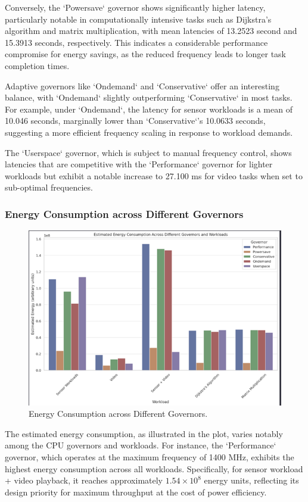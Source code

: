 \documentclass[conference]{IEEEtran}
\begin{document}
Conversely, the `Powersave` governor shows significantly higher latency, particularly notable in computationally intensive tasks such as Dijkstra's algorithm and matrix multiplication, with mean latencies of 13.2523 second and 15.3913 seconds, respectively. This indicates a considerable performance compromise for energy savings, as the reduced frequency leads to longer task completion times.

Adaptive governors like `Ondemand` and `Conservative` offer an interesting balance, with `Ondemand` slightly outperforming `Conservative` in most tasks. For example, under `Ondemand`, the latency for sensor workloads is a mean of 10.046 seconds, marginally lower than `Conservative`'s 10.0633 seconds, suggesting a more efficient frequency scaling in response to workload demands.

The `Userspace` governor, which is subject to manual frequency control, shows latencies that are competitive with the `Performance` governor for lighter workloads but exhibit a notable increase to 27.100 ms for video tasks when set to sub-optimal frequencies.

\subsubsection{Energy Consumption across Different Governors}
\begin{figure}[ht]
    \centering
    \includegraphics[width=0.75\linewidth]{energy_consumption_plot.png}
    \caption{Energy Consumption across Different Governors.}
    \label{fig:energy_consumption}
\end{figure}
\vspace{10pt}
The estimated energy consumption, as illustrated in the plot, varies notably among the CPU governors and workloads. For instance, the `Performance` governor, which operates at the maximum frequency of 1400 MHz, exhibits the highest energy consumption across all workloads. Specifically, for sensor workload + video playback, it reaches approximately \(1.54 \times 10^8\) energy units, reflecting its design priority for maximum throughput at the cost of power efficiency.
\end{document}
